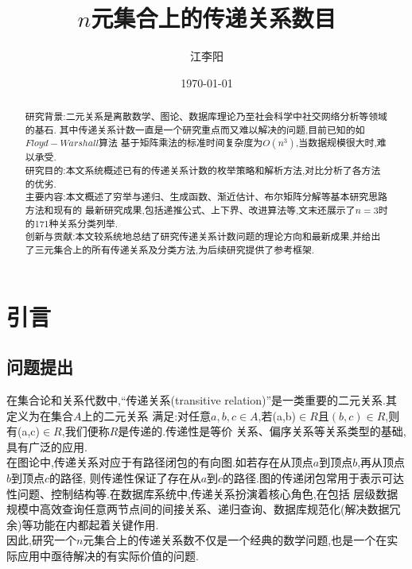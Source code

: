 \documentclass[12pt]{article}
\title{$n$元集合上的传递关系数目}
\author{江李阳}
\date{\today}
\theoremstyle{definition}
\begin{document}
\maketitle
\begin{abstract}
  研究背景:二元关系是离散数学、图论、数据库理论乃至社会科学中社交网络分析等领域的基石.
  其中传递关系计数一直是一个研究重点而又难以解决的问题,目前已知的如$Floyd-Warshall$算法
  基于矩阵乘法的标准时间复杂度为$O(n^3)$,当数据规模很大时,难以承受.\\
  \hspace*{2em}研究目的:本文系统概述已有的传递关系计数的枚举策略和解析方法,对比分析了各方法的优劣.\\
  \hspace*{2em}主要内容:本文概述了穷举与递归、生成函数、渐近估计、布尔矩阵分解等基本研究思路方法和现有的
  最新研究成果,包括递推公式、上下界、改进算法等,文末还展示了$n=3$时的171种关系分类列举.\\
  \hspace*{2em}创新与贡献:本文较系统地总结了研究传递关系计数问题的理论方向和最新成果,并给出了三元集合上的所有传递关系及分类方法,为后续研究提供了参考框架.


\end{abstract}
\tableofcontents 


\section{引言}
\subsection{问题提出}
在集合论和关系代数中,“传递关系(transitive relation)”是一类重要的二元关系.其定义为在集合$A$上的二元关系
满足:对任意$a,b,c \in A$,若(a,b)$\in R$且$(b,c) \in R$,则有(a,c)$\in R$,我们便称$R$是传递的.传递性是等价
关系、偏序关系等关系类型的基础,具有广泛的应用.\\
\hspace*{2em}在图论中,传递关系对应于有路径闭包的有向图.如若存在从顶点$a$到顶点$b$,再从顶点$b$到顶点$c$的路径,
则传递性保证了存在从$a$到$c$的路径.图的传递闭包常用于表示可达性问题、控制结构等.在数据库系统中,传递关系扮演着核心角色,在包括
层级数据规模中高效查询任意两节点间的间接关系、递归查询、数据库规范化(解决数据冗余)等功能在内都起着关键作用.\\
\hspace*{2em}因此,研究一个$n$元集合上的传递关系数不仅是一个经典的数学问题,也是一个在实际应用中亟待解决的有实际价值的问题.\\
\end{document}
